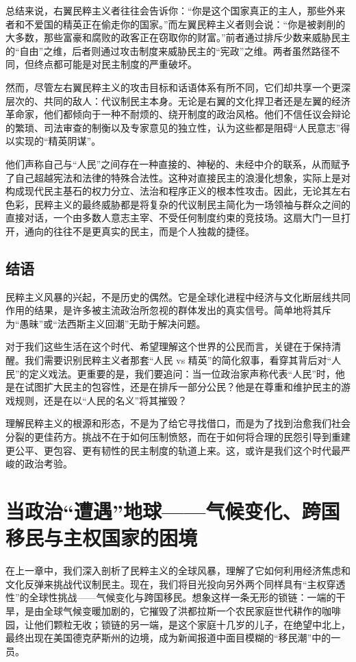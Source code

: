 \documentclass[a5paper, 11pt, openany]{ctexbook}
\begin{document}
总结来说，右翼民粹主义者往往会告诉你：“你是这个国家真正的主人，那些外来者和不爱国的精英正在偷走你的国家。”而左翼民粹主义者则会说：“你是被剥削的大多数，那些富豪和腐败的政客正在窃取你的财富。”前者通过排斥少数来威胁民主的“自由”之维，后者则通过攻击制度来威胁民主的“宪政”之维。两者虽然路径不同，但终点都可能是对民主制度的严重破坏。

然而，尽管左右翼民粹主义的攻击目标和话语体系有所不同，它们却共享一个更深层次的、共同的敌人：代议制民主本身。无论是右翼的文化捍卫者还是左翼的经济革命家，他们都倾向于一种不耐烦的、绕开制度的政治风格。他们不信任议会辩论的繁琐、司法审查的制衡以及专家意见的独立性，认为这些都是阻碍“人民意志”得以实现的“精英阴谋”。

他们声称自己与“人民”之间存在一种直接的、神秘的、未经中介的联系，从而赋予了自己超越宪法和法律的特殊合法性。这种对直接民主的浪漫化想象，实际上是对构成现代民主基石的权力分立、法治和程序正义的根本性攻击。因此，无论其左右色彩，民粹主义的最终威胁都是将复杂的代议制民主简化为一场领袖与群众之间的直接对话，一个由多数人意志主宰、不受任何制度约束的竞技场。这扇大门一旦打开，通向的往往不是更真实的民主，而是个人独裁的捷径。

\section*{结语}

民粹主义风暴的兴起，不是历史的偶然。它是全球化进程中经济与文化断层线共同作用的结果，是许多被主流政治所忽视的群体发出的真实信号。简单地将其斥为“愚昧”或“法西斯主义回潮”无助于解决问题。

对于我们这些生活在这个时代、希望理解这个世界的公民而言，关键在于保持清醒。我们需要识别民粹主义者那套“人民 vs 精英”的简化叙事，看穿其背后对“人民”的定义戏法。更重要的是，我们要追问：当一位政治家声称代表“人民”时，他是在试图扩大民主的包容性，还是在排斥一部分公民？他是在尊重和维护民主的游戏规则，还是在以“人民的名义”将其摧毁？

理解民粹主义的根源和形态，不是为了给它寻找借口，而是为了找到治愈我们社会分裂的更佳药方。挑战不在于如何压制愤怒，而在于如何将合理的民怨引导到重建更公平、更包容、更有韧性的民主制度的轨道上来。这，或许是我们这个时代最严峻的政治考验。

\chapter{当政治“遭遇”地球——气候变化、跨国移民与主权国家的困境}

在上一章中，我们深入剖析了民粹主义的全球风暴，理解了它如何利用经济焦虑和文化反弹来挑战代议制民主。现在，我们将目光投向另外两个同样具有“主权穿透性”的全球性挑战——气候变化与跨国移民。想象这样一条无形的锁链：一端的干旱，是由全球气候变暖加剧的，它摧毁了洪都拉斯一个农民家庭世代耕作的咖啡园，让他们颗粒无收；锁链的另一端，是这个家庭十几岁的儿子，在绝望中北上，最终出现在美国德克萨斯州的边境，成为新闻报道中面目模糊的“移民潮”中的一员。
\end{document}
